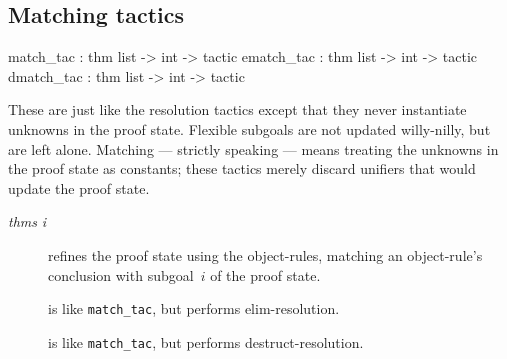 \subsection{Matching tactics} \label{match_tac}
\begin{ttbox} 
match_tac  : thm list -> int -> tactic
ematch_tac : thm list -> int -> tactic
dmatch_tac : thm list -> int -> tactic
\end{ttbox}
These are just like the resolution tactics except that they never
instantiate unknowns in the proof state.  Flexible subgoals are not updated
willy-nilly, but are left alone.  Matching --- strictly speaking --- means
treating the unknowns in the proof state as constants; these tactics merely
discard unifiers that would update the proof state.
\begin{description}
\item[ {\it thms} {\it i}] 
refines the proof state using the object-rules, matching an object-rule's
conclusion with subgoal~$i$ of the proof state.

\item[] 
is like {\tt match_tac}, but performs elim-resolution.

\item[] 
is like {\tt match_tac}, but performs destruct-resolution.
\end{description}


